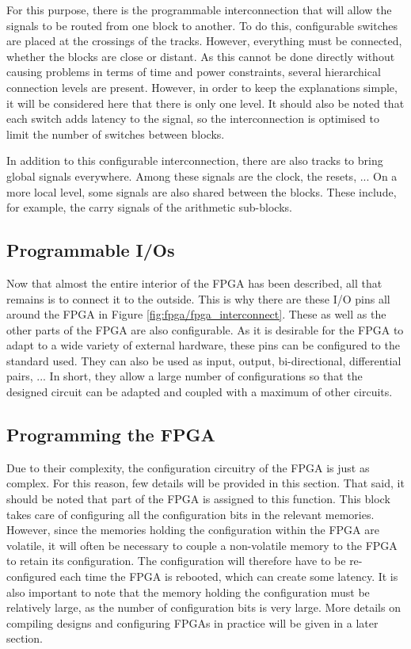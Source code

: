 For this purpose, there is the programmable interconnection that will allow the signals to be routed 
from one block to another. To do this, configurable switches are placed at the crossings of the 
tracks. However, everything must be connected, whether the blocks are close or distant. As this 
cannot be done directly without causing problems in terms of time and power constraints, several 
hierarchical connection levels are present. However, in order to keep the explanations simple, it 
will be considered here that there is only one level. It should also be noted that each switch adds 
latency to the signal, so the interconnection is optimised to limit the number of switches between 
blocks. 

In addition to this configurable interconnection, there are also tracks to bring global signals 
everywhere. Among these signals are the clock, the resets, ... On a more local level, some signals 
are also shared between the blocks. These include, for example, the carry signals of the arithmetic 
sub-blocks.

\subsection{Programmable I/Os}

Now that almost the entire interior of the FPGA has been described, all that remains is to connect 
it to the outside. This is why there are these I/O pins all around the FPGA in Figure 
\ref{fig:fpga/fpga_interconnect}. These as well as the other parts of the FPGA are also 
configurable. As it is desirable for the FPGA to adapt to a wide variety of external hardware, these 
pins can be configured to the standard used. They can also be used as input, output, bi-directional, 
differential pairs, ... In short, they allow a large number of configurations so that the designed 
circuit can be adapted and coupled with a maximum of other circuits.

\subsection{Programming the FPGA}


Due to their complexity, the configuration circuitry of the FPGA is just as complex. For this 
reason, few details will be provided in this section. That said, it should be noted that part of 
the FPGA is assigned to this function. This block takes care of configuring all the 
configuration bits in the relevant memories. However, since the memories holding the configuration 
within the FPGA are volatile, it will often be necessary to couple a non-volatile memory to the 
FPGA to retain its configuration. The configuration will therefore have to be re-configured each 
time the FPGA is rebooted, which can create some latency. It is also important to note that the 
memory holding the configuration must be relatively large, as the number of configuration bits is 
very large. More details on compiling designs and configuring FPGAs in practice will be given in a 
later section.

